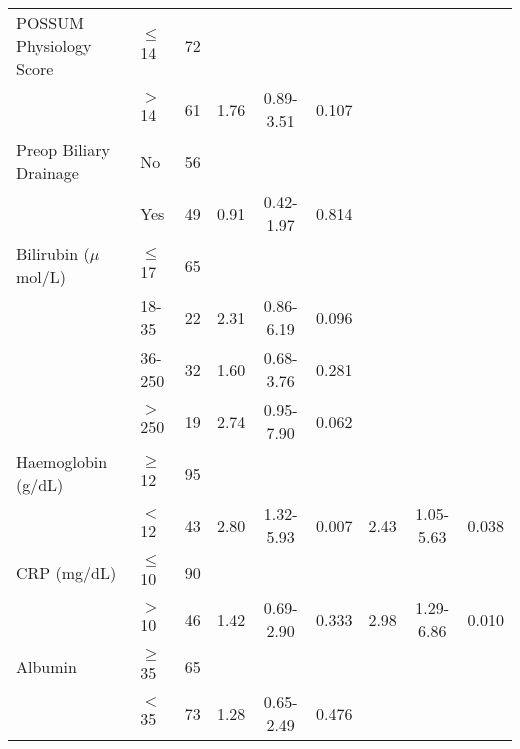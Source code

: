 \begin{sidewaystable}[p]
\begin{tabular}{|l l c| c c c| c c c|}
		POSSUM Physiology Score & $\leq$ 14 & 72     &      &           &            &      &           &  \\
		                        & $>$ 14    & 61     & 1.76 & 0.89-3.51 & 0.107      &      &           &  \\
		Preop Biliary Drainage  & No        & 56     &      &           &            &      &           &  \\
		                        & Yes       & 49     & 0.91 & 0.42-1.97 & 0.814      &      &           &  \\
		Bilirubin ($\mu$mol/L)  & $\leq$ 17 & 65     &      &           &            &      &           &  \\
		                        & 18-35     & 22     & 2.31 & 0.86-6.19 & 0.096      &      &           &  \\
		                        & 36-250    & 32     & 1.60 & 0.68-3.76 & 0.281      &      &           &  \\
		                        & $>$ 250   & 19     & 2.74 & 0.95-7.90 & 0.062      &      &           &  \\
		Haemoglobin (g/dL)      & $\geq$ 12 & 95     &      &           &            &      &           &  \\
		                        & $<$ 12    & 43     & 2.80 & 1.32-5.93 & 0.007      & 2.43 & 1.05-5.63 & 0.038      \\
		CRP (mg/dL)             & $\leq$ 10 & 90     &      &           &            &      &           &  \\
		                        & $>$ 10    & 46     & 1.42 & 0.69-2.90 & 0.333      & 2.98 & 1.29-6.86 & 0.010      \\
		Albumin                 & $\geq$ 35 & 65     &      &           &            &      &           &  \\
		                        & $<$ 35    & 73     & 1.28 & 0.65-2.49 & 0.476      &      &           &  \\ \hline
	\end{tabular}
\end{sidewaystable}